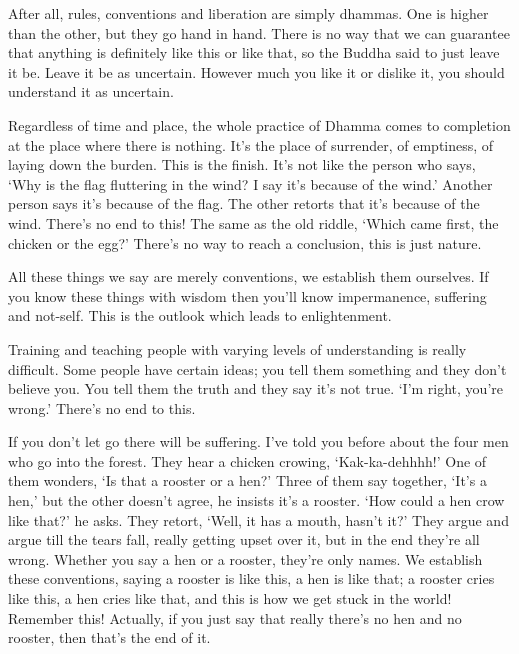 After all, rules, conventions and liberation are simply dhammas. One is higher than the other, but they go hand in hand. There is no way that we can guarantee that anything is definitely like this or like that, so the Buddha said to just leave it be. Leave it be as uncertain. However much you like it or dislike it, you should understand it as uncertain.

Regardless of time and place, the whole practice of Dhamma comes to completion at the place where there is nothing. It's the place of surrender, of emptiness, of laying down the burden. This is the finish. It's not like the person who says, `Why is the flag fluttering in the wind? I say it's because of the wind.' Another person says it's because of the flag. The other retorts that it's because of the wind. There's no end to this! The same as the old riddle, `Which came first, the chicken or the egg?' There's no way to reach a conclusion, this is just nature.

All these things we say are merely conventions, we establish them our\-selves. If you know these things with wisdom then you'll know impermanence, suffering and not-self. This is the outlook which leads to enlightenment.

Training and teaching people with varying levels of understanding is really difficult. Some people have certain ideas; you tell them something and they don't believe you. You tell them the truth and they say it's not true. `I'm right, you're wrong.' There's no end to this.

If you don't let go there will be suffering. I've told you before about the four men who go into the forest. They hear a chicken crowing, `Kak-ka-dehhhh!' One of them wonders, `Is that a rooster or a hen?' Three of them say together, `It's a hen,' but the other doesn't agree, he insists it's a rooster. `How could a hen crow like that?' he asks. They retort, `Well, it has a mouth, hasn't it?' They argue and argue till the tears fall, really getting upset over it, but in the end they're all wrong. Whether you say a hen or a rooster, they're only names. We establish these conventions, saying a rooster is like this, a hen is like that; a rooster cries like this, a hen cries like that, and this is how we get stuck in the world! Remember this! Actually, if you just say that really there's no hen and no rooster, then that's the end of it.

